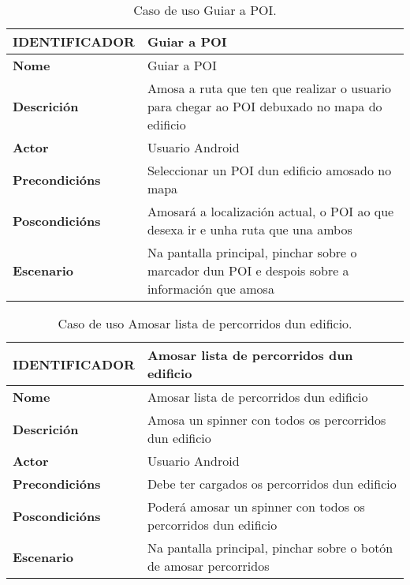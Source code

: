 \begin{table}[tbh]
	\begin{tabular}{|l|p{10cm}|}
		\hline 
		\textbf{IDENTIFICADOR}	& \textbf{Guiar a POI} \\ 
		\hline 
		\textbf{Nome} & Guiar a POI \\ 
		\hline 
		\textbf{Descrición} & Amosa a ruta que ten que realizar o usuario para chegar ao POI debuxado no mapa do edificio \\ 
		\hline 
		\textbf{Actor} & Usuario Android \\ 
		\hline 
		\textbf{Precondicións} & Seleccionar un POI dun edificio amosado no mapa \\ 
		\hline 
		\textbf{Poscondicións} & Amosará a localización actual, o POI ao que desexa ir e unha ruta que una ambos \\ 
		\hline 
		\textbf{Escenario} & Na pantalla principal, pinchar sobre o marcador dun POI e despois sobre a información que amosa \\ 
		\hline 
	\end{tabular}
	\caption{Caso de uso Guiar a POI.}
	\label{tab:cuGuiarPOI}
\end{table}

\begin{table}[tbh]
	\begin{tabular}{|l|p{10cm}|}
		\hline 
		\textbf{IDENTIFICADOR}	& \textbf{Amosar lista de percorridos dun edificio} \\ 
		\hline 
		\textbf{Nome} & Amosar lista de percorridos dun edificio \\ 
		\hline 
		\textbf{Descrición} & Amosa un spinner con todos os percorridos dun edificio \\ 
		\hline 
		\textbf{Actor} & Usuario Android \\ 
		\hline 
		\textbf{Precondicións} & Debe ter cargados os percorridos dun edificio \\ 
		\hline 
		\textbf{Poscondicións} & Poderá amosar un spinner con todos os percorridos dun edificio \\ 
		\hline 
		\textbf{Escenario} & Na pantalla principal, pinchar sobre o botón de amosar percorridos \\ 
		\hline 
	\end{tabular}
	\caption{Caso de uso Amosar lista de percorridos dun edificio.}
	\label{tab:cuAmosarListaPercorrido}
\end{table}

